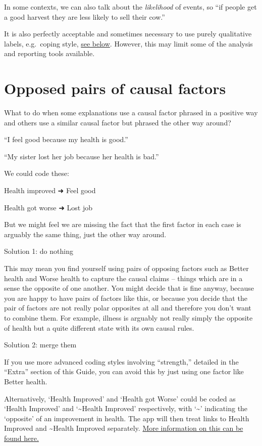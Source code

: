 \documentclass[
]{book}
\begin{document}
In some contexts, we can also talk about the \emph{likelihood} of events, so ``if people get a good harvest they are less likely to sell their cow.''

It is also perfectly acceptable and sometimes necessary to use purely qualitative labels, e.g.~coping style, \href{https://guide.causalmap.app/creating.html\#examples-of-non-quantitative-factors}{see below}. However, this may limit some of the analysis and reporting tools available.

\hypertarget{opposed-pairs-of-causal-factors}{%
\section{Opposed pairs of causal factors}\label{opposed-pairs-of-causal-factors}}

What to do when some explanations use a causal factor phrased in a positive way and others use a similar causal factor but phrased the other way around?

``I feel good because my health is good.''

``My sister lost her job because her health is bad.''

We could code these:

Health improved ➜ Feel good

Health got worse ➜ Lost job

But we might feel we are missing the fact that the first factor in each case is arguably the same thing, just the other way around.

Solution 1: do nothing

This may mean you find yourself using pairs of opposing factors such as Better health and Worse health to capture the causal claims -- things which are in a sense the opposite of one another. You might decide that is fine anyway, because you are happy to have pairs of factors like this, or because you decide that the pair of factors are not really polar opposites at all and therefore you don't want to combine them. For example, illness is arguably not really simply the opposite of health but a quite different state with its own causal rules.

Solution 2: merge them

If you use more advanced coding styles involving ``strength,'' detailed in the ``Extra'' section of this Guide, you can avoid this by just using one factor like Better health.

Alternatively, `Health Improved' and `Health got Worse' could be coded as `Health Improved' and `\textasciitilde Health Improved' respectively, with `\textasciitilde{}' indicating the `opposite' of an improvement in health. The app will then treat links to Health Improved and \textasciitilde Health Improved separately. \href{https://guide.causalmap.app/coding-opposites.html\#combining-opposites}{More information on this can be found here.}
\end{document}
